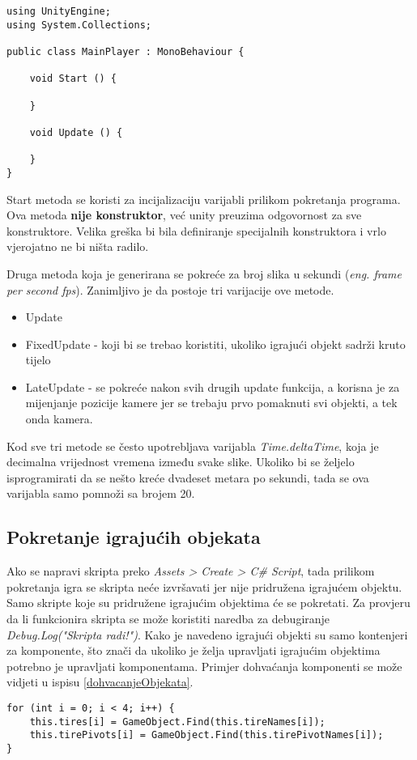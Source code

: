 \begin{lstlisting}[caption={Primjer skripte}, label=primjerSkripte]
using UnityEngine;
using System.Collections;

public class MainPlayer : MonoBehaviour {

    void Start () {
    
    }
    
    void Update () {
    
    }
}
\end{lstlisting}
Start metoda se koristi za incijalizaciju varijabli prilikom pokretanja programa. Ova metoda \textbf{nije konstruktor}, već unity preuzima odgovornost za sve konstruktore. Velika greška bi bila definiranje specijalnih konstruktora i vrlo vjerojatno ne bi ništa radilo. \par
Druga metoda koja je generirana se pokreće za broj slika u sekundi (\emph{eng. frame per second fps}). Zanimljivo je da postoje tri varijacije ove metode.
\begin{itemize} 
	\item Update
	\item FixedUpdate - koji bi se trebao koristiti, ukoliko igrajući objekt sadrži kruto tijelo
	\item LateUpdate - se pokreće nakon svih drugih update funkcija, a korisna je za mijenjanje pozicije kamere jer se trebaju prvo pomaknuti svi objekti, a tek onda kamera. 
\end{itemize}
Kod sve tri metode se često upotrebljava varijabla \textit{Time.deltaTime}, koja je decimalna vrijednost vremena između svake slike. Ukoliko bi se željelo isprogramirati da se nešto kreće dvadeset metara po sekundi, tada se ova varijabla samo pomnoži sa brojem 20.
\subsection{Pokretanje igrajućih objekata}
Ako se napravi skripta preko \emph{Assets > Create > C\# Script}, tada prilikom pokretanja igra se skripta neće izvršavati jer nije pridružena igrajućem objektu. Samo skripte koje su pridružene igrajućim objektima će se pokretati. Za provjeru da li funkcionira skripta se može koristiti naredba za debugiranje \emph{Debug.Log("Skripta radi!")}. Kako je navedeno igrajući objekti su samo kontenjeri za komponente, što znači da ukoliko je želja upravljati igrajućim objektima potrebno je upravljati komponentama. Primjer dohvaćanja komponenti se može vidjeti u ispisu \ref{dohvacanjeObjekata}. 
\begin{lstlisting}[caption={Dohvaćanje objekata}, label=dohvacanjeObjekata]
for (int i = 0; i < 4; i++) {
	this.tires[i] = GameObject.Find(this.tireNames[i]);
	this.tirePivots[i] = GameObject.Find(this.tirePivotNames[i]);
}
\end{lstlisting}
